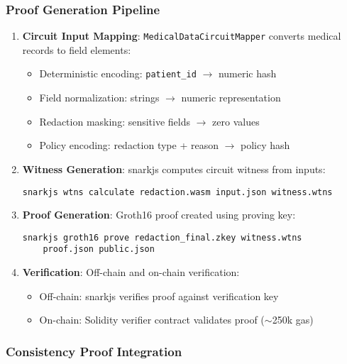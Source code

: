 \subsubsection{Proof Generation Pipeline}

\begin{enumerate}
    \item \textbf{Circuit Input Mapping}: \texttt{MedicalDataCircuitMapper} converts medical records to field elements:
    \begin{itemize}
        \item Deterministic encoding: \texttt{patient\_id} $\rightarrow$ numeric hash
        \item Field normalization: strings $\rightarrow$ numeric representation
        \item Redaction masking: sensitive fields $\rightarrow$ zero values
        \item Policy encoding: redaction type + reason $\rightarrow$ policy hash
    \end{itemize}
    
    \item \textbf{Witness Generation}: snarkjs computes circuit witness from inputs:
    \begin{verbatim}
snarkjs wtns calculate redaction.wasm input.json witness.wtns
    \end{verbatim}
    
    \item \textbf{Proof Generation}: Groth16 proof created using proving key:
    \begin{verbatim}
snarkjs groth16 prove redaction_final.zkey witness.wtns 
    proof.json public.json
    \end{verbatim}
    
    \item \textbf{Verification}: Off-chain and on-chain verification:
    \begin{itemize}
        \item Off-chain: snarkjs verifies proof against verification key
        \item On-chain: Solidity verifier contract validates proof ($\sim$250k gas)
    \end{itemize}
\end{enumerate}

\subsubsection{Consistency Proof Integration}

